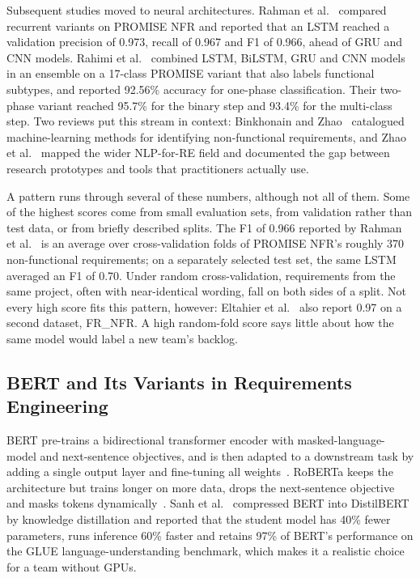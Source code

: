 \documentclass[conference,10pt,letterpaper]{IEEEtran}
\begin{document}
Subsequent studies moved to neural architectures. Rahman et al.~\cite{rahman2019} compared recurrent variants on PROMISE NFR and reported that an LSTM reached a validation precision of 0.973, recall of 0.967 and F1 of 0.966, ahead of GRU and CNN models. Rahimi et al.~\cite{rahimi2021} combined LSTM, BiLSTM, GRU and CNN models in an ensemble on a 17-class PROMISE variant that also labels functional subtypes, and reported 92.56\% accuracy for one-phase classification. Their two-phase variant reached 95.7\% for the binary step and 93.4\% for the multi-class step. Two reviews put this stream in context: Binkhonain and Zhao~\cite{binkhonain2019} catalogued machine-learning methods for identifying non-functional requirements, and Zhao et al.~\cite{zhao2022nlp4re} mapped the wider NLP-for-RE field and documented the gap between research prototypes and tools that practitioners actually use.

A pattern runs through several of these numbers, although not all of them. Some of the highest scores come from small evaluation sets, from validation rather than test data, or from briefly described splits. The F1 of 0.966 reported by Rahman et al.~\cite{rahman2019} is an average over cross-validation folds of PROMISE NFR's roughly 370 non-functional requirements; on a separately selected test set, the same LSTM averaged an F1 of 0.70. Under random cross-validation, requirements from the same project, often with near-identical wording, fall on both sides of a split. Not every high score fits this pattern, however: Eltahier et al.~\cite{eltahier2025} also report 0.97 on a second dataset, FR\_NFR. A high random-fold score says little about how the same model would label a new team's backlog.

\subsection{BERT and Its Variants in Requirements Engineering}
BERT pre-trains a bidirectional transformer encoder with masked-language-model and next-sentence objectives, and is then adapted to a downstream task by adding a single output layer and fine-tuning all weights~\cite{devlin2019}. RoBERTa keeps the architecture but trains longer on more data, drops the next-sentence objective and masks tokens dynamically~\cite{liu2019roberta}. Sanh et al.~\cite{sanh2019distilbert} compressed BERT into DistilBERT by knowledge distillation and reported that the student model has 40\% fewer parameters, runs inference 60\% faster and retains 97\% of BERT's performance on the GLUE language-understanding benchmark, which makes it a realistic choice for a team without GPUs.
\end{document}
